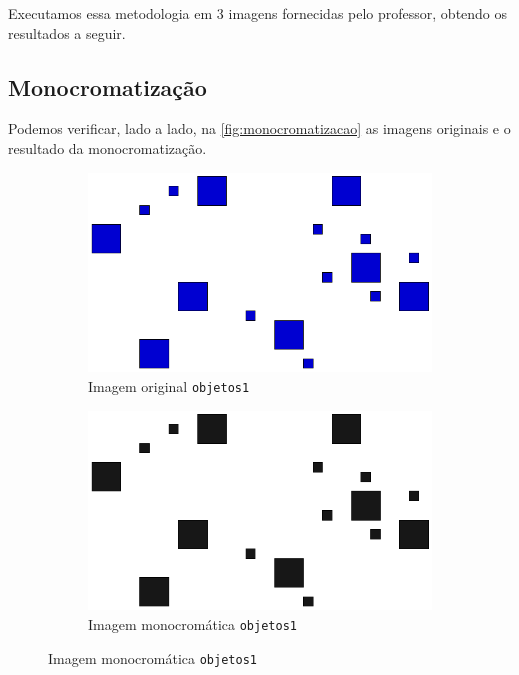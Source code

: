 \documentclass[brazilian,a4paper,twocolumn]{article}
\begin{document}
    Executamos essa metodologia em 3 imagens fornecidas pelo professor, obtendo os resultados a seguir.

    \subsection{Monocromatização}

        Podemos verificar, lado a lado, na \cref{fig:monocromatizacao} as imagens originais e o resultado da monocromatização.

        \begin{figure}[H]
            \centering

            \begin{subfigure}{0.23\textwidth}
                \includegraphics[width=\textwidth,keepaspectratio]{objetos1}
                \caption{Imagem original \texttt{objetos1}}
                \label{fig:objetos1-orig}
            \end{subfigure}
            \hfill
            \begin{subfigure}{0.23\textwidth}
                \includegraphics[width=\textwidth,keepaspectratio]{objetos1-objetos}
                \caption{Imagem monocromática \texttt{objetos1}}
                \label{fig:objetos1-mono}
            \end{subfigure}


\end{figure}
\end{document}
